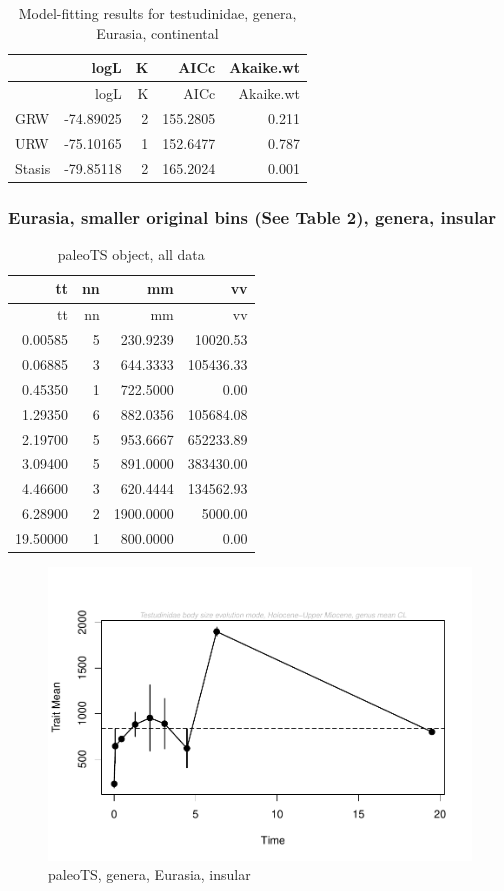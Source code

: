 \documentclass[]{article}
\begin{document}
\begin{longtable}[]{@{}lrrrr@{}}
\caption{Model-fitting results for testudinidae, genera, Eurasia,
continental}\tabularnewline
\toprule
& logL & K & AICc & Akaike.wt\tabularnewline
\midrule
\endfirsthead
\toprule
& logL & K & AICc & Akaike.wt\tabularnewline
\midrule
\endhead
GRW & -74.89025 & 2 & 155.2805 & 0.211\tabularnewline
URW & -75.10165 & 1 & 152.6477 & 0.787\tabularnewline
Stasis & -79.85118 & 2 & 165.2024 & 0.001\tabularnewline
\bottomrule
\end{longtable}

\newpage 

\subsubsection{Eurasia, smaller original bins (See Table 2), genera,
insular}\label{eurasia-smaller-original-bins-see-table-2-genera-insular}

\begin{longtable}[]{@{}rrrr@{}}
\caption{paleoTS object, all data}\tabularnewline
\toprule
tt & nn & mm & vv\tabularnewline
\midrule
\endfirsthead
\toprule
tt & nn & mm & vv\tabularnewline
\midrule
\endhead
0.00585 & 5 & 230.9239 & 10020.53\tabularnewline
0.06885 & 3 & 644.3333 & 105436.33\tabularnewline
0.45350 & 1 & 722.5000 & 0.00\tabularnewline
1.29350 & 6 & 882.0356 & 105684.08\tabularnewline
2.19700 & 5 & 953.6667 & 652233.89\tabularnewline
3.09400 & 5 & 891.0000 & 383430.00\tabularnewline
4.46600 & 3 & 620.4444 & 134562.93\tabularnewline
6.28900 & 2 & 1900.0000 & 5000.00\tabularnewline
19.50000 & 1 & 800.0000 & 0.00\tabularnewline
\bottomrule
\end{longtable}

\begin{figure}[htbp]
\centering
\includegraphics{MA_JJ_files/figure-latex/pTSEsI-1.pdf}
\caption{paleoTS, genera, Eurasia, insular}
\end{figure}
\end{document}
